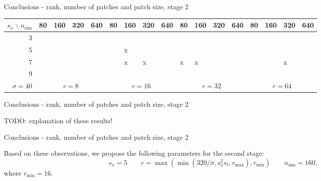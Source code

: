 \documentclass[mathserif, 8pt]{beamer}
\makeatletter
\newcounter{multipleslide}
\newcommand{\restoreframe}{%
\patchcmd{\beamer@@tmpl@footline}%
	{\themultipleslide}%
	{\insertframenumber}%
	{}%
	{}%
\setcounter{framenumber}{\value{multipleslide}}%
}
\makeatother
\begin{document}
\begin{frame}{Conclusions - rank, number of patches and patch size, stage 2}
\begin{center}
		\medskip

		{\small
		\begin{tabular}{r ||p{.1cm}|p{.1cm}|p{.1cm}|p{.1cm}||p{.1cm}|p{.1cm}|p{.1cm}|p{.1cm}||p{.1cm}|p{.1cm}|p{.1cm}|p{.1cm}||p{.1cm}|p{.1cm}|p{.1cm}|p{.1cm}||}
				$s_x \backslash n_{\text{sim}}$  & {\tiny 80} & {\tiny 160} & {\tiny 320} & {\tiny 640} & {\tiny 80} & {\tiny 160} & {\tiny 320} & {\tiny 640} & {\tiny 80} & {\tiny 160} & {\tiny 320} & {\tiny 640} & {\tiny 80} & {\tiny 160} & {\tiny 320} & {\tiny 640} \\\hline
		  3 &  &  &  &  &  &  &  &  &  &  &  &  &  &  &  &  \\[.1cm]\hline
		  5 &  &  &  &  &  &x &  &  &  &  &  &  &  &  &  &  \\[.1cm]\hline
		  7 &  &  &  &  &  &x &x &  &x &x &  &  &  &  &x &  \\[.1cm]\hline
		  9 &  &  &  &  &  &  &  &  &  &  &  &  &  &  &  &  \\[.1cm]\hline
		$\sigma=40$& \multicolumn{4}{c||}{$r =  8$} & 
		\multicolumn{4}{c||}{$r = 16$} & 
		\multicolumn{4}{c||}{$r = 32$} & 
		\multicolumn{4}{c||}{$r = 64$} 
		\end{tabular}}
	\end{center}

\end{frame}

\begin{frame}{Conclusions - rank, number of patches and patch size, stage 2}

	TODO: explanation of these results!

\end{frame}

\begin{frame}{Conclusions - rank, number of patches and patch size, stage 2}
	\begin{center}
	Based on these observations, we propose the following parameters for the second stage:
	\[s_x = 5 \quad\quad r = \max(\min(320/\sigma,s_x^2s_t,r_{\text{max}}), r_{\text{min}})\quad\quad n_{\text{sim}} = 160,\]
	where $r_{\text{min}} = 16$.
	\end{center}
\end{frame}
\restoreframe
\end{document}
